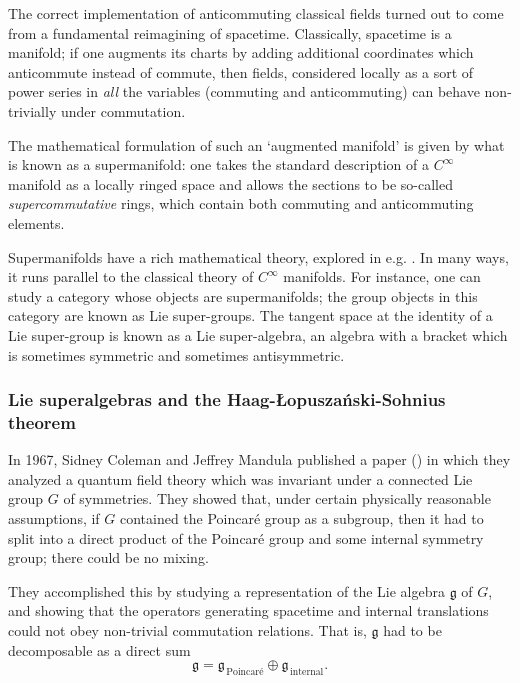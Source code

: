 \documentclass[a4paper,10pt]{scrreprt}
\theoremstyle{definition}
\theoremstyle{plain}
\theoremstyle{remark}
\begin{document}
The correct implementation of anticommuting classical fields turned out to come from a fundamental reimagining of spacetime. Classically, spacetime is a manifold; if one augments its charts by adding additional coordinates which anticommute instead of commute, then fields, considered locally as a sort of power series in \emph{all} the variables (commuting and anticommuting) can behave non-trivially under commutation.

The mathematical formulation of such an `augmented manifold' is given by what is known as a supermanifold: one takes the standard description of a $C^{\infty}$ manifold as a locally ringed space and allows the sections to be so-called \emph{supercommutative} rings, which contain both commuting and anticommuting elements.

Supermanifolds have a rich mathematical theory, explored in e.g. \cite{susy-for-mathematicians}. In many ways, it runs parallel to the classical theory of $C^{\infty}$ manifolds. For instance, one can study a category whose objects are supermanifolds; the group objects in this category are known as Lie super-groups. The tangent space at the identity of a Lie super-group is known as a Lie super-algebra, an algebra with a bracket which is sometimes symmetric and sometimes antisymmetric.

\subsubsection{Lie superalgebras and the Haag-{\L}opusza{\'n}ski-Sohnius theorem}

In 1967, Sidney Coleman and Jeffrey Mandula published a paper (\cite{coleman-mandula}) in which they analyzed a quantum field theory which was invariant under a connected Lie group $G$ of symmetries. They showed that, under certain physically reasonable assumptions, if $G$ contained the Poincar\'{e} group as a subgroup, then it had to split into a direct product of the Poincar\'{e} group and some internal symmetry group; there could be no mixing.

They accomplished this by studying a representation of the Lie algebra $\mathfrak{g}$ of $G$, and showing that the operators generating spacetime and internal translations could not obey non-trivial commutation relations. That is, $\mathfrak{g}$ had to be decomposable as a direct sum
\begin{equation*}
  \mathfrak{g} = \mathfrak{g}_{\,\text{Poincar\'{e}}} \oplus \mathfrak{g}_{\,\text{internal}}.
\end{equation*}
\end{document}
